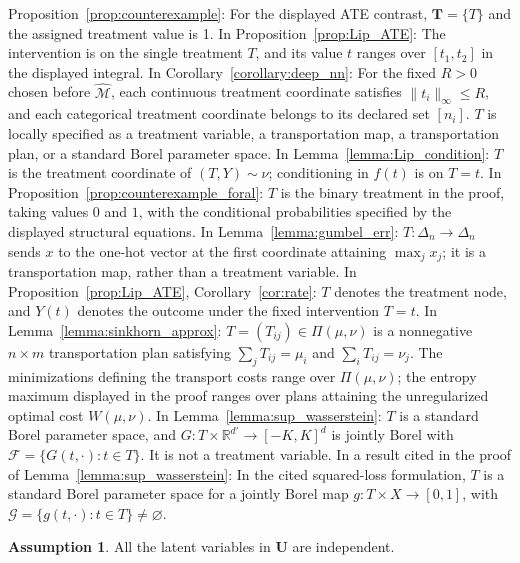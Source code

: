 \documentclass[12pt]{article}
\theoremstyle{plain}
\theoremstyle{definition}
\newtheorem{assumption}[theorem]{Assumption}
\theoremstyle{remark}
\begin{document}
Proposition~\ref{prop:counterexample}: For the displayed ATE contrast, $\boldsymbol{T}=\{T\}$ and the assigned treatment value is 1. In Proposition~\ref{prop:Lip_ATE}: The intervention is on the single treatment $T$, and its value $t$ ranges over $[t_1,t_2]$ in the displayed integral. In Corollary~\ref{corollary:deep_nn}: For the fixed $R>0$ chosen before $\hat{\mathcal M}$, each continuous treatment coordinate satisfies $\|t_i\|_\infty\leqslant R$, and each categorical treatment coordinate belongs to its declared set $[n_i]$. $T$ is locally specified as a treatment variable, a transportation map, a transportation plan, or a standard Borel parameter space. In Lemma~\ref{lemma:Lip_condition}: $T$ is the treatment coordinate of $(T,Y)\sim\nu$; conditioning in $f(t)$ is on $T=t$. In Proposition~\ref{prop:counterexample_foral}: $T$ is the binary treatment in the proof, taking values $0$ and $1$, with the conditional probabilities specified by the displayed structural equations. In Lemma~\ref{lemma:gumbel_err}: $T:\Delta_n\rightarrow\Delta_n$ sends $x$ to the one-hot vector at the first coordinate attaining $\max_j x_j$; it is a transportation map, rather than a treatment variable. In Proposition~\ref{prop:Lip_ATE}, Corollary~\ref{cor:rate}: $T$ denotes the treatment node, and $Y(t)$ denotes the outcome under the fixed intervention $T=t$. In Lemma~\ref{lemma:sinkhorn_approx}: $T=(T_{ij})\in\Pi(\mu,\nu)$ is a nonnegative $n\times m$ transportation plan satisfying $\sum_jT_{ij}=\mu_i$ and $\sum_iT_{ij}=\nu_j$. The minimizations defining the transport costs range over $\Pi(\mu,\nu)$; the entropy maximum displayed in the proof ranges over plans attaining the unregularized optimal cost $W(\mu,\nu)$. In Lemma~\ref{lemma:sup_wasserstein}: $T$ is a standard Borel parameter space, and $G:T\times\mathbb R^{d'}\rightarrow[-K,K]^d$ is jointly Borel with $\mathcal F=\{G(t,\cdot):t\in T\}$. It is not a treatment variable. In a result cited in the proof of Lemma~\ref{lemma:sup_wasserstein}: In the cited squared-loss formulation, $T$ is a standard Borel parameter space for a jointly Borel map $g:T\times X\rightarrow[0,1]$, with $\mathcal G=\{g(t,\cdot):t\in T\}\ne\varnothing$.


\begin{assumption} \label{assump:independence_u}
All the latent variables in $ \boldsymbol{U}$ are independent.
\end{assumption}
\end{document}
